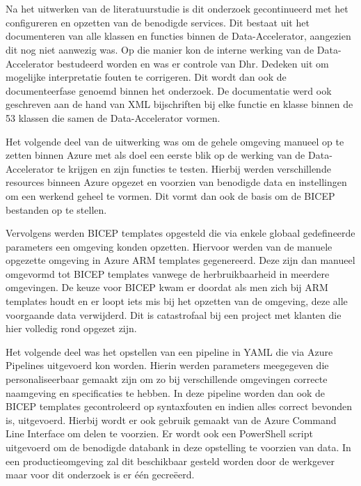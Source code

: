 \section{}%
\label{sec:Verloop}

Na het uitwerken van de literatuurstudie is dit onderzoek gecontinueerd met het configureren en opzetten van de benodigde services. Dit bestaat uit het documenteren van alle klassen en functies binnen de Data-Accelerator, aangezien dit nog niet aanwezig was. Op die manier kon de interne werking van de Data-Accelerator bestudeerd worden en was er controle van Dhr. Dedeken uit om mogelijke interpretatie fouten te corrigeren. Dit wordt dan ook de documenteerfase genoemd binnen het onderzoek. De documentatie werd ook geschreven aan de hand van XML bijschriften bij elke functie en klasse binnen de 53 klassen die samen de Data-Accelerator vormen.

Het volgende deel van de uitwerking was om de gehele omgeving manueel op te zetten binnen Azure met als doel een eerste blik op de werking van de Data-Accelerator te krijgen en zijn functies te testen. Hierbij werden verschillende resources binneen Azure opgezet en voorzien van benodigde data en instellingen om een werkend geheel te vormen. Dit vormt dan ook de basis om de BICEP bestanden op te stellen.

Vervolgens werden BICEP templates opgesteld die via enkele globaal gedefineerde parameters een omgeving konden opzetten. Hiervoor werden van de manuele opgezette omgeving in Azure ARM templates gegenereerd. Deze zijn dan manueel omgevormd tot BICEP templates vanwege de herbruikbaarheid in meerdere omgevingen. De keuze voor BICEP kwam er doordat als men zich bij ARM templates houdt en er loopt iets mis bij het opzetten van de omgeving, deze alle voorgaande data verwijderd. Dit is catastrofaal bij een project met klanten die hier volledig rond opgezet zijn.

Het volgende deel was het opstellen van een pipeline in YAML die via Azure Pipelines uitgevoerd kon worden. Hierin werden parameters meegegeven die personaliseerbaar gemaakt zijn om zo bij verschillende omgevingen correcte naamgeving en specificaties te hebben. In deze pipeline worden dan ook de BICEP templates gecontroleerd op syntaxfouten en indien alles correct bevonden is, uitgevoerd. Hierbij wordt er ook gebruik gemaakt van de Azure Command Line Interface om delen te voorzien. Er wordt ook een PowerShell script uitgevoerd om de benodigde databank in deze opstelling te voorzien van data. In een productieomgeving zal dit beschikbaar gesteld worden door de werkgever maar voor dit onderzoek is er één gecreëerd.

